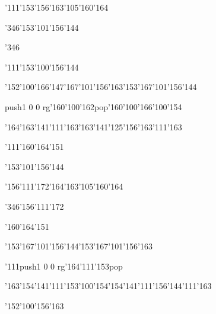 \null\vfill\ipa\centerline{\enskip\char'111\char'153\enskip\enskip\enskip\enskip\enskip\char'156\char'163\char'105\char'160\char'164}\medskip\centerline{\enskip\char'346\enskip\enskip\enskip\enskip\enskip\char'153\char'101\char'156\char'144\enskip\enskip\enskip}\medskip\centerline{\enskip\char'346\enskip\enskip\enskip\enskip\enskip\enskip\enskip\enskip\enskip\enskip}\medskip\centerline{\enskip\char'111\char'153\enskip\char'100\char'156\char'144\enskip\enskip\enskip\enskip\enskip\enskip\enskip}\medskip\centerline{\enskip\char'152\char'100\char'166\enskip\char'147\char'167\char'101\char'156\char'163\enskip\char'153\char'167\char'101\char'156\char'144\enskip\enskip\enskip}\medskip\centerline{\enskip\enskip\enskip\pdfcolorstack\match push{1 0 0 rg}\char'160\char'100\char'162\pdfcolorstack\match pop{}\enskip\enskip\enskip\enskip\enskip\char'160\char'100\char'166\enskip\char'100\char'154}\medskip\centerline{\enskip\char'164\char'163\char'141\char'111\char'163\enskip\enskip\enskip\enskip\char'163\char'141\char'125\char'156\char'163\enskip\char'111\char'163}\medskip\centerline{\enskip\char'111\enskip\char'160\char'164\char'151\enskip\enskip\enskip\enskip\enskip\enskip}\medskip\centerline{\enskip\enskip\enskip\enskip\enskip\enskip\enskip\enskip\enskip\enskip\enskip\char'153\char'101\char'156\char'144}\medskip\vfill\footline{\hfil\tt\folio\hfil}\eject
\null\vfill\ipa\centerline{\enskip\enskip\enskip\enskip\char'156\char'111\char'172\enskip\char'164\char'163\char'105\char'160\char'164}\medskip\centerline{\enskip\char'346\enskip\char'156\char'111\char'172\enskip\enskip\enskip\enskip\enskip\enskip\enskip\enskip}\medskip\centerline{\enskip\enskip\enskip\char'160\char'164\char'151\enskip\enskip\enskip\enskip\enskip\enskip}\medskip\centerline{\enskip\enskip\enskip\enskip\enskip\enskip\enskip\enskip\enskip\enskip\enskip\enskip\enskip\enskip}\medskip\centerline{\enskip\enskip\enskip\enskip\enskip\char'153\char'167\char'101\char'156\char'144\enskip\char'153\char'167\char'101\char'156\char'163\enskip\enskip\enskip}\medskip\centerline{\enskip\char'111\enskip\enskip\enskip\enskip\enskip\pdfcolorstack\match push{1 0 0 rg}\char'164\char'111\char'153\pdfcolorstack\match pop{}\enskip\enskip\enskip\enskip\enskip\enskip\enskip}\medskip\centerline{\enskip\char'163\char'154\char'141\char'111\char'153\enskip\char'100\char'154\enskip\char'154\char'141\char'111\char'156\char'144\enskip\char'111\char'163}\medskip\centerline{\enskip\enskip\enskip\enskip\enskip\enskip\enskip\enskip\enskip\enskip\enskip\enskip}\medskip\centerline{\enskip\enskip\enskip\enskip\enskip\enskip\enskip\enskip\enskip\enskip\enskip\char'152\char'100\char'156\char'163}\medskip\vfill\footline{\hfil\tt\folio\hfil}\eject
